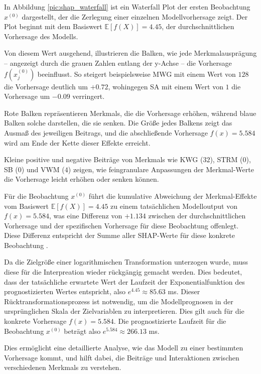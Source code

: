 In Abbildung \ref{pic:shap_waterfall} ist ein Waterfall Plot der ersten Beobachtung $x^{(0)}$ dargestellt, 
der die Zerlegung einer einzelnen Modellvorhersage zeigt. Der Plot beginnt mit dem Basiswert $\mathbb{E}[f(X)] = 4.45$, 
der durchschnittlichen Vorhersage des Modells. 

Von diesem Wert ausgehend, illustrieren die Balken, wie jede Merkmalausprägung – 
angezeigt durch die grauen Zahlen entlang der y-Achse – die Vorhersage $f(x_{j}^{(0)})$ beeinflusst. 
So steigert beispielsweise MWG mit einem Wert von $128$ die Vorhersage deutlich um $+0.72$, 
wohingegen SA mit einem Wert von $1$ die Vorhersage um $-0.09$ verringert.

Rote Balken repräsentieren Merkmals, die die Vorhersage erhöhen, während blaue Balken solche 
darstellen, die sie senken. Die Größe jedes Balkens zeigt das Ausmaß des jeweiligen Beitrags, 
und die abschließende Vorhersage $f(x) = 5.584$ wird am Ende der Kette dieser Effekte erreicht. 

Kleine positive und negative Beiträge von Merkmals wie KWG ($32$), STRM ($0$), SB ($0$) und VWM ($4$) 
zeigen, wie feingranulare Anpassungen der Merkmal-Werte die Vorhersage leicht erhöhen oder senken können.

Für die Beobachtung $x^{(0)}$ führt die kumulative Abweichung der Merkmal-Effekte 
vom Basiswert $\mathbb{E}[f(X)] = 4.45$ zu einem tatsächlichen Modelloutput von $f(x) = 5.584$, 
was eine Differenz von $+1.134$ zwischen der durchschnittlichen Vorhersage 
und der spezifischen Vorhersage für diese Beobachtung offenlegt. 
Diese Differenz entspricht der Summe aller SHAP-Werte für diese konkrete Beobachtung \cite[S. 52f]{Molnar_2023}.

Da die Zielgröße einer logarithmischen Transformation unterzogen wurde, muss diese für die Interpreation wieder rückgängig gemacht werden. 
Dies bedeutet, dass der tatsächliche erwartete Wert der Laufzeit der Exponentialfunktion des prognostizierten Wertes entspricht, also $e^{4.45} \approx 85.63$ ms. 
Dieser Rücktransformationsprozess ist notwendig, um die Modellprognosen in der ursprünglichen Skala der Zielvariablen zu interpretieren.
Dies gilt auch für die konkrete Vorhersage $f(x) = 5.584$. Die prognostizierte Laufzeit für die Beobachtung $x^{(0)}$ beträgt also $e^{5.584} \approx 266.13$ ms.

Dies ermöglicht eine detaillierte Analyse, wie das Modell zu einer bestimmten Vorhersage kommt, 
und hilft dabei, die Beiträge und Interaktionen zwischen verschiedenen Merkmals zu verstehen.

